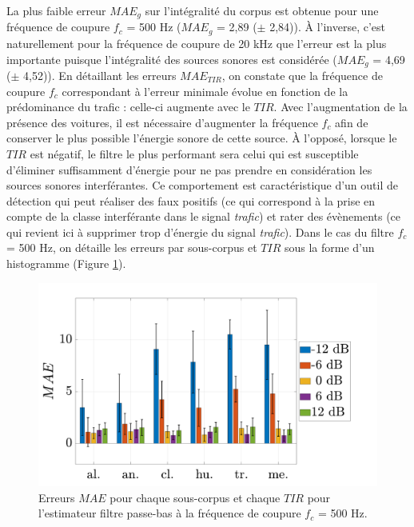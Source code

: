 La plus faible erreur $MAE_g$ sur l'intégralité du corpus est obtenue pour une fréquence de coupure $f_c$ = 500 Hz ($MAE_g$ = 2,89 ($\pm$ 2,84)).
\`A l'inverse, c'est naturellement pour la fréquence de coupure de 20 kHz que l'erreur est la plus importante puisque l'intégralité des sources sonores est considérée ($MAE_g$ = 4,69 ($\pm$ 4,52)).
En détaillant les erreurs $MAE_{TIR}$, on constate que la fréquence de coupure $f_c$ correspondant à l'erreur minimale évolue en fonction de la prédominance du trafic : celle-ci augmente avec le $TIR$.
Avec l'augmentation de la présence des voitures, il est nécessaire d'augmenter la fréquence $f_c$ afin de conserver le plus possible l'énergie sonore de cette source. \`A l'opposé, lorsque le $TIR$ est négatif, le filtre le plus performant sera celui qui est susceptible d'éliminer suffisamment d'énergie pour ne pas prendre en considération les sources sonores interférantes. Ce comportement est caractéristique d'un outil de détection qui peut réaliser des faux positifs (ce qui correspond à la prise en compte de la classe interférante dans le signal \textit{trafic}) et rater des évènements (ce qui revient ici à supprimer trop d'énergie du signal \textit{trafic}).
Dans le cas du filtre $f_c$ = 500 Hz, on détaille les erreurs par sous-corpus et $TIR$ sous la forme d'un histogramme (Figure \ref{fig:filtre_amb_tir}).

\begin{figure}[h!]
\centering
\includegraphics[width=0.7\linewidth]{./figures/resultats/amb_filtre_500_bar.pdf}
\caption{Erreurs $MAE$ pour chaque sous-corpus et chaque $TIR$ pour l'estimateur filtre passe-bas à la fréquence de coupure $f_c$ = 500 Hz.}
\label{fig:filtre_amb_tir}
\end{figure}

